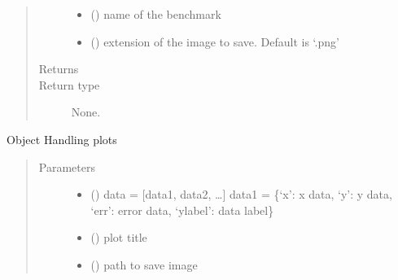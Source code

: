\documentclass[letterpaper,10pt,english]{sphinxmanual}
\begin{document}
\begin{fulllineitems}
\begin{quote}
\begin{description}
\begin{itemize}
\item {} 
\sphinxAtStartPar
{} () \textendash{} name of the benchmark

\item {} 
\sphinxAtStartPar
{} () \textendash{} extension of the image to save. Default is ‘.png’

\end{itemize}

\item[{Returns}] \leavevmode
\sphinxAtStartPar


\item[{Return type}] \leavevmode
\sphinxAtStartPar
None.

\end{description}\end{quote}

\begin{fulllineitems}
\label{\detokenize{api/postprocessing:plotter.Plotter.__init__}}
\sphinxAtStartPar
Object Handling plots
\begin{quote}\begin{description}
\item[{Parameters}] \leavevmode\begin{itemize}
\item {} 
\sphinxAtStartPar
{} () \textendash{} data = {[}data1, data2, …{]}
data1 = \{‘x’: x data, ‘y’: y data, ‘err’: error data,
‘ylabel’: data label\}

\item {} 
\sphinxAtStartPar
{} () \textendash{} plot title

\item {} 
\sphinxAtStartPar
{} () \textendash{} path to save image


\end{itemize}
\end{description}
\end{quote}
\end{fulllineitems}
\end{fulllineitems}
\end{document}
